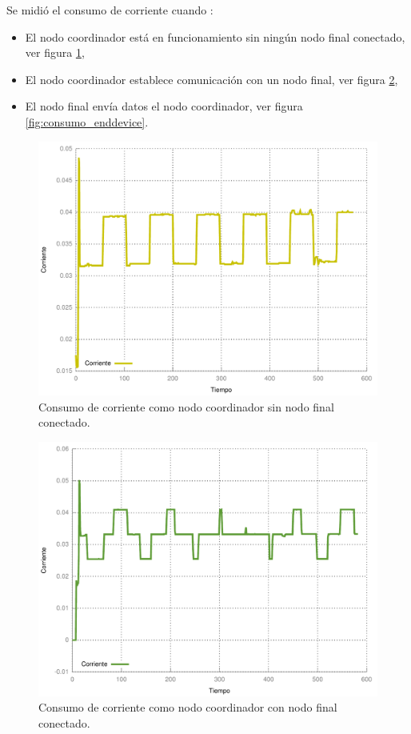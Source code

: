 Se midi\'o el consumo de corriente cuando : 

\begin{itemize}
\item El nodo coordinador est\'a en funcionamiento sin ning\'un nodo final conectado, ver figura \ref{fig:coordinador_sinnodo},
\item El nodo coordinador establece comunicaci\'on con un nodo final, ver figura \ref{fig:coordinador_connodo},
\item El nodo final env\'ia datos el nodo coordinador, ver figura \ref{fig:consumo_enddevice}.
\end{itemize}

\begin{figure}
	\centering
	\includegraphics[scale=0.5]{capitulo_4_imgs/corriente_sd_sinnodo.pdf}
	\caption{Consumo de corriente como nodo coordinador sin nodo final conectado.}
	\label{fig:coordinador_sinnodo}
\end{figure}

\begin{figure}
	\centering
	\includegraphics[scale=0.5]{capitulo_4_imgs/corriente_sd_connodo.pdf}
	\caption{Consumo de corriente como nodo coordinador con nodo final conectado.}
	\label{fig:coordinador_connodo}
\end{figure}

